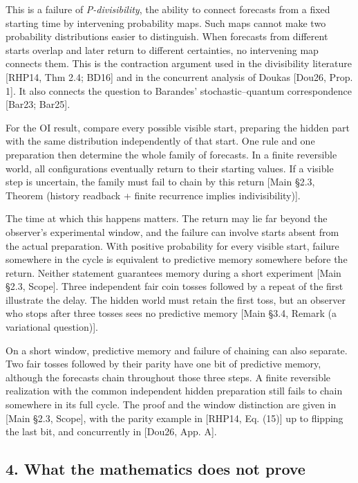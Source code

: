 \documentclass[
]{article}
\begin{document}
This is a failure of \emph{P-divisibility}, the ability to connect
forecasts from a fixed starting time by intervening probability maps.
Such maps cannot make two probability distributions easier to
distinguish. When forecasts from different starts overlap and later
return to different certainties, no intervening map connects them. This
is the contraction argument used in the divisibility literature
{[}RHP14, Thm 2.4; BD16{]} and in the concurrent analysis of Doukas
{[}Dou26, Prop. 1{]}. It also connects the question to Barandes'
stochastic--quantum correspondence {[}Bar23; Bar25{]}.

For the OI result, compare every possible visible start, preparing the
hidden part with the same distribution independently of that start. One
rule and one preparation then determine the whole family of forecasts.
In a finite reversible world, all configurations eventually return to
their starting values. If a visible step is uncertain, the family must
fail to chain by this return {[}Main §2.3, Theorem (history readback +
finite recurrence implies indivisibility){]}.

The time at which this happens matters. The return may lie far beyond
the observer's experimental window, and the failure can involve starts
absent from the actual preparation. With positive probability for every
visible start, failure somewhere in the cycle is equivalent to
predictive memory somewhere before the return. Neither statement
guarantees memory during a short experiment {[}Main §2.3, Scope{]}.
Three independent fair coin tosses followed by a repeat of the first
illustrate the delay. The hidden world must retain the first toss, but
an observer who stops after three tosses sees no predictive memory
{[}Main §3.4, Remark (a variational question){]}.

On a short window, predictive memory and failure of chaining can also
separate. Two fair tosses followed by their parity have one bit of
predictive memory, although the forecasts chain throughout those three
steps. A finite reversible realization with the common independent
hidden preparation still fails to chain somewhere in its full cycle. The
proof and the window distinction are given in {[}Main §2.3, Scope{]},
with the parity example in {[}RHP14, Eq. (15){]} up to flipping the last
bit, and concurrently in {[}Dou26, App. A{]}.

\hypertarget{what-the-mathematics-does-not-prove}{%
\subsection{4. What the mathematics does not
prove}\label{what-the-mathematics-does-not-prove}}
\end{document}
